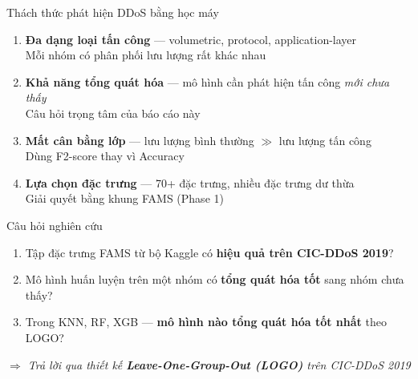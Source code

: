 \documentclass[aspectratio=169,12pt]{beamer}
\newcommand{\sidenote}[1]{\textcolor{mygray}{\small #1}}
\begin{document}
\begin{frame}{Thách thức phát hiện DDoS bằng học máy}
  \begin{enumerate}
    \item \textbf{Đa dạng loại tấn công} --- volumetric, protocol, application-layer\\
    \sidenote{Mỗi nhóm có phân phối lưu lượng rất khác nhau}
    \vspace{0.4em}
    \item \textbf{Khả năng tổng quát hóa} --- mô hình cần phát hiện tấn công \emph{mới chưa thấy}\\
    \sidenote{Câu hỏi trọng tâm của báo cáo này}
    \vspace{0.4em}
    \item \textbf{Mất cân bằng lớp} --- lưu lượng bình thường $\gg$ lưu lượng tấn công\\
    \sidenote{Dùng F2-score thay vì Accuracy}
    \vspace{0.4em}
    \item \textbf{Lựa chọn đặc trưng} --- 70+ đặc trưng, nhiều đặc trưng dư thừa\\
    \sidenote{Giải quyết bằng khung FAMS (Phase 1)}
  \end{enumerate}
\end{frame}

\begin{frame}{Câu hỏi nghiên cứu}
  \begin{block}{}
    \begin{enumerate}
      \item Tập đặc trưng FAMS từ bộ Kaggle có \textbf{hiệu quả trên CIC-DDoS 2019}?
      \vspace{0.5em}
      \item Mô hình huấn luyện trên một nhóm có \textbf{tổng quát hóa tốt} sang nhóm chưa thấy?
      \vspace{0.5em}
      \item Trong KNN, RF, XGB --- \textbf{mô hình nào tổng quát hóa tốt nhất} theo LOGO?
    \end{enumerate}
  \end{block}
  \vspace{0.5em}
  \begin{center}
    \textit{$\Rightarrow$ Trả lời qua thiết kế \textbf{Leave-One-Group-Out (LOGO)} trên CIC-DDoS 2019}
  \end{center}
\end{frame}
\end{document}
